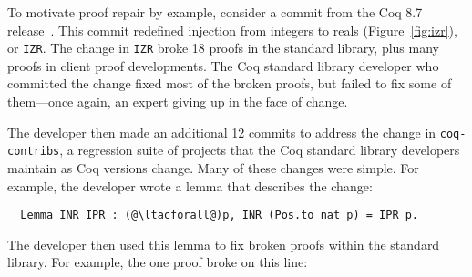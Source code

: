 \begin{figure*}
\begin{minipage}{0.55\textwidth}
\centering
\lstset{language=coq, aboveskip=0pt, belowskip=0pt}



\end{minipage}
\hfill
\begin{minipage}{0.44\textwidth}
\centering
\lstset{language=coq, aboveskip=0pt, belowskip=0pt}



\end{minipage}
\caption[Caption]{Old (left) and new (right) definitions of \lstinline{IZR} in Coq.
The old definition applies injection from naturals to reals and conversion of positives to
naturals; the new definition applies injection from positives to reals.
In contrast with most terms shown in this thesis,
this term uses pattern matching and recursion rather than .}
\label{fig:izr}
\end{figure*}

To motivate proof repair by example, consider a commit from the Coq 8.7 release~\cite{coq87commit}.
This commit redefined injection from integers to reals (Figure~\ref{fig:izr}), or \lstinline{IZR}.
The change in \lstinline{IZR} broke 18 proofs in the standard library, plus many proofs in
client proof developments.
The Coq standard library developer who committed the change fixed most of the broken proofs,
but failed to fix some of them---once again, an expert giving up in the face of change.

The developer then made an additional 12 commits to address the change in \lstinline{coq-contribs},
a regression suite of projects that the Coq standard library developers maintain as Coq versions change.
Many of these changes were simple. For example, the developer wrote a lemma that describes the change:

\lstset{language=coq, aboveskip=3pt, belowskip=3pt}
\begin{lstlisting}
  Lemma INR_IPR : (@\ltacforall@)p, INR (Pos.to_nat p) = IPR p.
\end{lstlisting}
The developer then used this lemma to fix broken proofs within the standard library. 
For example, the one proof broke on this line:

